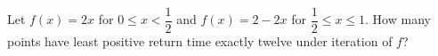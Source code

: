 Let $f(x)=2x$ for $0\le x<\dfrac{1}{2}$ and $f(x)=2-2x$ for $\dfrac{1}{2}\le x\le1$. How many points have least positive return time exactly twelve under iteration of $f$?
